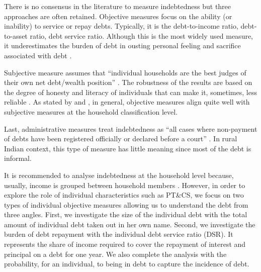 \documentclass[a4paper, 11pt, onecolumn]{article}
\newcommand{\PTCS}{PT\&CS}
\begin{document}
There is no consensus in the literature to measure indebtedness but three approaches are often retained.
Objective measures focus on the ability (or inability) to service or repay debts.
Typically, it is the debt-to-income ratio, debt-to-asset ratio, debt service ratio.
Although this is the most widely used measure, it underestimates the burden of debt in ousting personal feeling and sacrifice associated with debt \citep{Betti2007}.
 
Subjective measure assumes that ``individual households are the best judges of their own net debt/wealth position'' \citep{Betti2007}.
The robustness of the results are based on the degree of honesty and literacy of individuals that can make it, sometimes, less reliable \citep{DAlessio2013}.
As stated by \cite{Rinaldi2006} and \cite{Keese2012}, in general, objective measures align quite well with subjective measures at the household classification level.

Last, administrative measures treat indebtedness  as ``all cases where non-payment of debts have been registered officially or declared before a court'' \citep{Betti2007}.
In rural Indian context, this type of measure has little meaning since most of the debt is informal.


It is recommended to analyse indebtedness at the household level because, usually, income is grouped between household members \citep{European2010}.
However, in order to explore the role of individual characteristics such as \PTCS, we focus on two types of individual objective measures allowing us to understand the debt from three angles.
First, we investigate the size of the individual debt with the total amount of individual debt taken out in her own name.
Second, we investigate the burden of debt repayment with the individual debt service ratio (DSR).
It represents the share of income required to cover the repayment of interest and principal on a debt for one year.
We also complete the analysis with the probability, for an individual, to being in debt to capture the incidence of debt.

\end{document}
